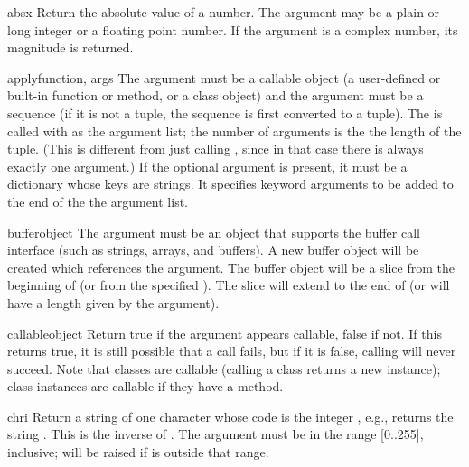 \begin{funcdesc}{abs}{x}
  Return the absolute value of a number.  The argument may be a plain
  or long integer or a floating point number.  If the argument is a
  complex number, its magnitude is returned.
\end{funcdesc}

\begin{funcdesc}{apply}{function, args}
The  argument must be a callable object (a user-defined or
built-in function or method, or a class object) and the 
argument must be a sequence (if it is not a tuple, the sequence is
first converted to a tuple).  The  is called with
 as the argument list; the number of arguments is the the length
of the tuple.  (This is different from just calling
, since in that case there is always
exactly one argument.)
If the optional  argument is present, it must be a
dictionary whose keys are strings.  It specifies keyword arguments to
be added to the end of the the argument list.
\end{funcdesc}

\begin{funcdesc}{buffer}{object}
The  argument must be an object that supports the
buffer call interface (such as strings, arrays, and buffers). A new
buffer object will be created which references the  argument.
The buffer object will be a slice from the beginning of 
(or from the specified ). The slice will extend to the
end of  (or will have a length given by the 
argument).
\end{funcdesc}

\begin{funcdesc}{callable}{object}
Return true if the  argument appears callable, false if
not.  If this returns true, it is still possible that a call fails,
but if it is false, calling  will never succeed.  Note
that classes are callable (calling a class returns a new instance);
class instances are callable if they have a  method.
\end{funcdesc}

\begin{funcdesc}{chr}{i}
  Return a string of one character whose \ASCII{} code is the integer
  , e.g.,  returns the string .  This is the
  inverse of .  The argument must be in the range [0..255],
  inclusive;  will be raised if  is
  outside that range.
\end{funcdesc}

